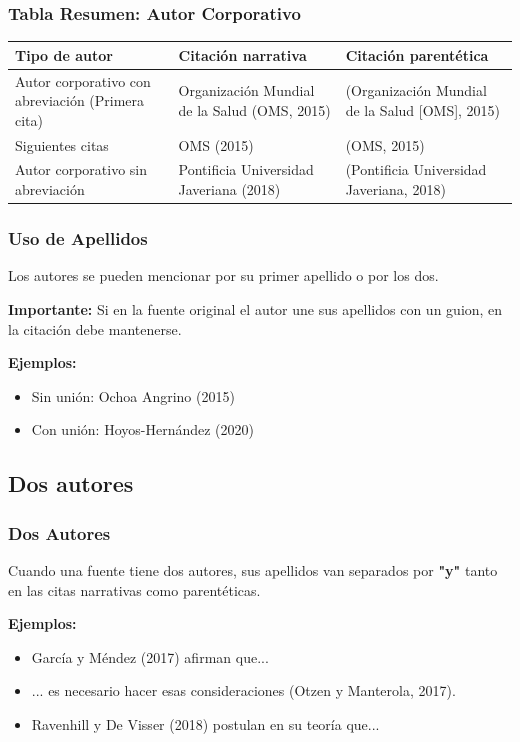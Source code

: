 \documentclass[aspectratio=169]{beamer}
\begin{document}
\begin{frame}
	\frametitle{Tabla Resumen: Autor Corporativo}
	\small
	\begin{tabular}{>{\raggedright}p{3.5cm}|>{\raggedright}p{3.5cm}|>{\raggedright\arraybackslash}p{3.5cm}}
		\toprule
		\textbf{Tipo de autor} & \textbf{Citación narrativa} & \textbf{Citación parentética} \\
		\midrule
		Autor corporativo con abreviación (Primera cita) & Organización Mundial de la Salud (OMS, 2015) & (Organización Mundial de la Salud [OMS], 2015) \\
		\midrule
		Siguientes citas & OMS (2015) & (OMS, 2015) \\
		\midrule
		Autor corporativo sin abreviación & Pontificia Universidad Javeriana (2018) & (Pontificia Universidad Javeriana, 2018) \\
		\bottomrule
	\end{tabular}
\end{frame}

\begin{frame}
	\frametitle{Uso de Apellidos}
	Los autores se pueden mencionar por su primer apellido o por los dos.
	
	\vspace{1em}
	
	\textbf{Importante:} Si en la fuente original el autor une sus apellidos con un guion, en la citación debe mantenerse.
	
	\vspace{1em}
	
	\textbf{Ejemplos:}
	\begin{itemize}
		\item Sin unión: Ochoa Angrino (2015)
		\item Con unión: Hoyos-Hernández (2020)
	\end{itemize}
\end{frame}

\subsection{Dos autores}

\begin{frame}
	\frametitle{Dos Autores}
	Cuando una fuente tiene dos autores, sus apellidos van separados por \textbf{"y"} tanto en las citas narrativas como parentéticas.
	
	\vspace{1em}
	
	\textbf{Ejemplos:}
	\begin{itemize}
		\item García y Méndez (2017) afirman que...
		\item ... es necesario hacer esas consideraciones (Otzen y Manterola, 2017).
		\item Ravenhill y De Visser (2018) postulan en su teoría que...
	\end{itemize}
	
\end{frame}
\end{document}
